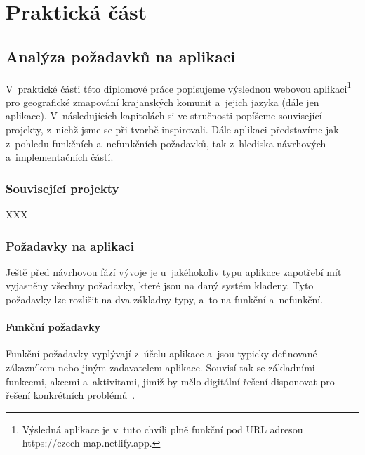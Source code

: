 \part{Praktická část}

\hypertarget{analuxfdza-poux17eadavkux16f-na-aplikaci}{%
\chapter{Analýza požadavků na aplikaci}\label{analuxfdza-poux17eadavkux16f-na-aplikaci}}

V~praktické části této diplomové práce popisujeme výslednou webovou aplikaci\footnote{Výsledná aplikace je v~tuto chvíli plně funkční pod URL adresou https://czech-map.netlify.app.} pro geografické zmapování krajanských komunit a~jejich jazyka (dále jen aplikace). V~následujících kapitolách si ve stručnosti popíšeme související projekty, z~nichž jsme se při tvorbě inspirovali. Dále aplikaci představíme jak z~pohledu funkčních a~nefunkčních požadavků, tak z~hlediska návrhových a~implementačních částí.

\hypertarget{souvisejuxedcuxed-projekty}{%
\section{Související projekty}\label{souvisejuxedcuxed-projekty}}

XXX

\hypertarget{poux17eadavky-na-aplikaci}{%
\section{Požadavky na aplikaci}\label{poux17eadavky-na-aplikaci}}

Ještě před návrhovou fází vývoje je u~jakéhokoliv typu aplikace zapotřebí mít vyjasněny všechny požadavky, které jsou na daný systém kladeny. Tyto požadavky lze rozlišit na dva základny typy, a~to na funkční a~nefunkční.

\hypertarget{funkux10dnuxed-poux17eadavky}{%
\subsection{Funkční požadavky}\label{funkux10dnuxed-poux17eadavky}}

Funkční požadavky vyplývají z~účelu aplikace a~jsou typicky definované zákazníkem nebo jiným zadavatelem aplikace. Souvisí tak se základními funkcemi, akcemi a~aktivitami, jimiž by mělo digitální řešení disponovat pro řešení konkrétních problémů~\parencite{Gorton2006}.

